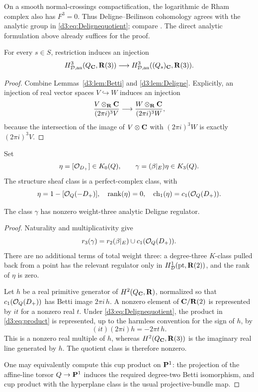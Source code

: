 \begin{remark}
On a smooth normal-crossings compactification, the logarithmic de Rham complex also has $F^3=0$. Thus Deligne--Beilinson cohomology agrees with the analytic group in \eqref{d3:eq:Delignequotient}; compare \cite[Remark~2.13]{EsnaultViehweg}. The direct analytic formulation above already suffices for the proof.
\end{remark}

\begin{lemma}\label{d3:lem:Deligneinject}
For every $s\in S$, restriction induces an injection
\[
H_{\mathcal D,\mathrm{an}}^3(Q_{\mathbf C},\mathbf R(3))\longrightarrow H_{\mathcal D,\mathrm{an}}^3((Q_s)_{\mathbf C},\mathbf R(3)).
\]
\end{lemma}
\begin{proof}
Combine Lemmas~\ref{d3:lem:Betti} and \ref{d3:lem:Deligne}. Explicitly, an injection of real vector spaces $V\hookrightarrow W$ induces an injection
\[
\frac{V\otimes_{\mathbf R}\mathbf C}{(2\pi i)^3V}
\longrightarrow
\frac{W\otimes_{\mathbf R}\mathbf C}{(2\pi i)^3W},
\]
because the intersection of the image of $V\otimes\mathbf C$ with $(2\pi i)^3W$ is exactly $(2\pi i)^3V$.
\end{proof}

Set
\[
\eta=[\mathcal O_{D_+}]\in K_0(Q),\qquad
\gamma=(\beta|_E)\eta\in K_3(Q).
\]
The structure sheaf class is a perfect-complex class, with
\[
\eta=1-[\mathcal O_Q(-D_+)],\quad \operatorname{rank}(\eta)=0,\quad
\operatorname{ch}_1(\eta)=c_1(\mathcal O_Q(D_+)).
\]

\begin{lemma}\label{d3:lem:product}
The class $\gamma$ has nonzero weight-three analytic Deligne regulator.
\end{lemma}
\begin{proof}
Naturality and multiplicativity give
\begin{equation}\label{d3:eq:product}
r_3(\gamma)=r_2(\beta|_E)\cup c_1(\mathcal O_Q(D_+)).
\end{equation}
There are no additional terms of total weight three: a degree-three $K$-class pulled back from a point has the relevant regulator only in $H^1_{\mathcal D}(\mathrm{pt},\mathbf R(2))$, and the rank of $\eta$ is zero.

Let $h$ be a real primitive generator of $H^2(Q_{\mathbf C},\mathbf R)$, normalized so that $c_1(\mathcal O_Q(D_+))$ has Betti image $2\pi i\,h$. A nonzero element of $\mathbf C/\mathbf R(2)$ is represented by $it$ for a nonzero real $t$. Under \eqref{d3:eq:Delignequotient}, the product in \eqref{d3:eq:product} is represented, up to the harmless convention for the sign of $h$, by
\[
(it)(2\pi i)h=-2\pi t\,h.
\]
This is a nonzero real multiple of $h$, whereas $H^2(Q_{\mathbf C},\mathbf R(3))$ is the imaginary real line generated by $h$. The quotient class is therefore nonzero.

One may equivalently compute this cup product on $\mathbf P^1$: the projection of the affine-line torsor $Q\to\mathbf P^1$ induces the required degree-two Betti isomorphism, and cup product with the hyperplane class is the usual projective-bundle map.
\end{proof}

